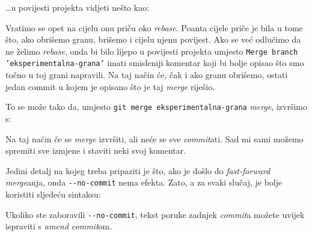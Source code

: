 

\dots{}u povijesti projekta vidjeti nešto kao:



Vratimo se opet na cijelu onu priču oko \emph{rebase}.
Poanta cijele priče je bila u tome što, ako obrišemo granu, brišemo i cijelu njenu povijest.
Ako se već odlučimo da ne želimo \emph{rebase}, onda bi bilo lijepo u povijesti projekta umjesto \texttt{Merge branch 'eksperimentalna-grana'} imati smisleniji komentar koji bi bolje opisao što smo točno u toj grani napravili.
Na taj način će, čak i ako granu obrišemo, ostati jedan commit u kojem je opisano što je taj \emph{merge} riješio.

To se može tako da, umjesto \verb+git merge eksperimentalna-grana+ \emph{merge}, izvršimo s:


Na taj naćin če se \emph{merge} izvršiti, ali neće se sve \emph{commit}ati. 
Sad mi sami možemo spremiti sve izmjene i staviti neki svoj komentar.

Jedini detalj na kojeg treba pripaziti je što, ako je došlo do \emph{fast-forward} \emph{merge}anja, onda \verb+--no-commit+ nema efekta.
Zato, a za svaki slučaj, je bolje koristiti sljedeću sintaksu:


Ukoliko ste zaboravili \verb+--no-commit+, tekst poruke zadnjek \emph{commit}a možete uvijek ispraviti s \emph{amend commit}om.
